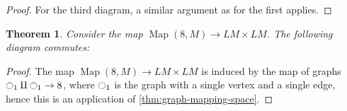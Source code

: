 \documentclass{scrartcl}
\theoremstyle{plain}
\newtheorem{theorem}{Theorem}[section]
\theoremstyle{definition}
\DeclareMathOperator{\id}{id}
\DeclareMathOperator{\Map}{Map}
\renewcommand{\coprod}{\mathbin{\amalg}}
\begin{document}
\begin{proof}

    For the third diagram, a similar argument as for the first applies.
\end{proof}

\begin{theorem}
    Consider the map $\Map(8, M)\to LM\times LM$. The following diagram commutes:

    \begin{center}
    \end{center}
\end{theorem}

\begin{proof}
    The map $\Map(8, M)\to LM\times LM$ is induced by the map of graphs $\ocircle_1\coprod \ocircle_1 \to 8$, where $\ocircle_1$ is the graph with a single vertex and a single edge, hence this is an application of \ref{thm:graph-mapping-space}.
\end{proof}
\end{document}
